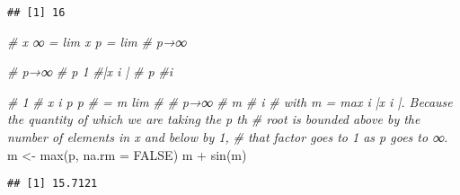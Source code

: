 \documentclass[
]{article}
\newenvironment{Shaded}{\begin{snugshade}}{\end{snugshade}}
\newcommand{\AttributeTok}[1]{\textcolor[rgb]{0.77,0.63,0.00}{#1}}
\newcommand{\CommentTok}[1]{\textcolor[rgb]{0.56,0.35,0.01}{\textit{#1}}}
\newcommand{\ConstantTok}[1]{\textcolor[rgb]{0.00,0.00,0.00}{#1}}
\newcommand{\FunctionTok}[1]{\textcolor[rgb]{0.00,0.00,0.00}{#1}}
\newcommand{\NormalTok}[1]{#1}
\newcommand{\OtherTok}[1]{\textcolor[rgb]{0.56,0.35,0.01}{#1}}
\newcommand{\SpecialCharTok}[1]{\textcolor[rgb]{0.00,0.00,0.00}{#1}}
\begin{document}
\begin{verbatim}
## [1] 16
\end{verbatim}

\begin{Shaded}
\begin{Highlighting}[]
\CommentTok{\# x ∞ = lim x p = lim}
\CommentTok{\# p→∞}


\CommentTok{\# p→∞}
\CommentTok{\# p 1}
\CommentTok{\#|x i |}
\CommentTok{\#  p}
\CommentTok{\#i}

\CommentTok{\# 1}
\CommentTok{\# x i p p}
\CommentTok{\# = m lim}
\CommentTok{\#}
\CommentTok{\# p→∞}
\CommentTok{\# m}
\CommentTok{\# i}
\CommentTok{\# with m = max i |x i |. Because the quantity of which we are taking the p th}
\CommentTok{\# root is bounded above by the number of elements in x and below by 1,}
\CommentTok{\# that factor goes to 1 as p goes to ∞.}
\NormalTok{m }\OtherTok{\textless{}{-}} \FunctionTok{max}\NormalTok{(p, }\AttributeTok{na.rm =} \ConstantTok{FALSE}\NormalTok{)}
\NormalTok{m }\SpecialCharTok{+} \FunctionTok{sin}\NormalTok{(m)}
\end{Highlighting}
\end{Shaded}

\begin{verbatim}
## [1] 15.7121
\end{verbatim}
\end{document}
